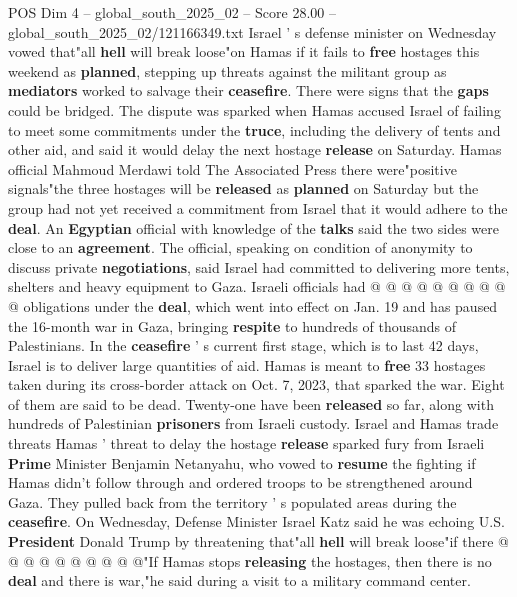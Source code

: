 \begin{textsample}{POS Dim 4 – global\_south\_2025\_02 – Score 28.00 – global\_south\_2025\_02/121166349.txt}  \label{ex:f4_pos_027}
Israel ' s defense minister on Wednesday vowed that"all \textbf{hell} will break loose"on Hamas if it fails to \textbf{free} hostages this weekend as \textbf{planned}, stepping up threats against the militant group as \textbf{mediators} worked to salvage their \textbf{ceasefire}.
There were signs that the \textbf{gaps} could be bridged.
The dispute was sparked when Hamas accused Israel of failing to meet some commitments under the \textbf{truce}, including the delivery of tents and other aid, and said it would delay the next hostage \textbf{release} on Saturday.
Hamas official Mahmoud Merdawi told The Associated Press there were"positive signals"the three hostages will be \textbf{released} as \textbf{planned} on Saturday but the group had not yet received a commitment from Israel that it would adhere to the \textbf{deal}.
An \textbf{Egyptian} official with knowledge of the \textbf{talks} said the two sides were close to an \textbf{agreement}.
The official, speaking on condition of anonymity to discuss private \textbf{negotiations}, said Israel had committed to delivering more tents, shelters and heavy equipment to Gaza.
Israeli officials had @ @ @ @ @ @ @ @ @ @ obligations under the \textbf{deal}, which went into effect on Jan. 19 and has paused the 16-month war in Gaza, bringing \textbf{respite} to hundreds of thousands of Palestinians.
In the \textbf{ceasefire} ' s current first stage, which is to last 42 days, Israel is to deliver large quantities of aid.
Hamas is meant to \textbf{free} 33 hostages taken during its cross-border attack on Oct. 7, 2023, that sparked the war.
Eight of them are said to be dead.
Twenty-one have been \textbf{released} so far, along with hundreds of Palestinian \textbf{prisoners} from Israeli custody.
Israel and Hamas trade threats Hamas ' threat to delay the hostage \textbf{release} sparked fury from Israeli \textbf{Prime} Minister Benjamin Netanyahu, who vowed to \textbf{resume} the fighting if Hamas didn't follow through and ordered troops to be strengthened around Gaza.
They pulled back from the territory ' s populated areas during the \textbf{ceasefire}.
On Wednesday, Defense Minister Israel Katz said he was echoing U.S. \textbf{President} Donald Trump by threatening that"all \textbf{hell} will break loose"if there @ @ @ @ @ @ @ @ @ @"If Hamas stops \textbf{releasing} the hostages, then there is no \textbf{deal} and there is war,"he said during a visit to a military command center.

\end{textsample}
